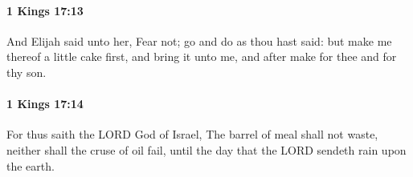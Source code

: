 		\paragraph{1 Kings 17:13} %
			\label{1KINGS-17-13}

			And Elijah said unto her, Fear not; go and do as thou hast said: but make me thereof a little cake first, and bring it unto me, and after make for thee and for thy son.


		\paragraph{1 Kings 17:14} %
			\label{1KINGS-17-14}

			For thus saith the LORD God of Israel, The barrel of meal shall not waste, neither shall the cruse of oil fail, until the day that the LORD sendeth rain upon the earth.


